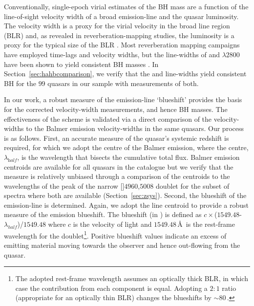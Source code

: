 Conventionally, single-epoch virial estimates of the BH mass are a function of the line-of-sight velocity width of a broad emission-line and the quasar luminosity. 
The velocity width is a proxy for the virial velocity in the broad line region (BLR) and, as revealed in reverberation-mapping studies, the luminosity is a proxy for the typical size of the BLR \citep[the $R-L$ relation; e.g.][]{kaspi00,kaspi07}. 
Most reverberation mapping campaigns have employed \hb time-lags and velocity widths, but the line-widths of \ha and $\lambda$$2800$ have been shown to yield consistent BH masses \citep[e.g.][]{mclure02,greene05b,onken08,shen08,wang09,rafiee11,mejia-restrepo16}. 
In Section~\ref{sec:hahbcomparison}, we verify that the \ha and \hb line-widths yield consistent BH for the $99$ quasars in our sample with measurements of both.     

In our work, a robust measure of the  emission-line `blueshift' provides the basis for the corrected  velocity-width measurements, and hence BH masses.
The effectiveness of the scheme is validated via a direct comparison of the  velocity-widths to the Balmer emission velocity-widths in the same quasars. 
Our process is as follows. 
First, an accurate measure of the quasar's systemic redshift is required, for which we adopt the centre of the Balmer emission, where the centre, $\lambda_{\mathrm half}$, is the wavelength that bisects the cumulative total flux. 
Balmer emission centroids are available for all quasars in the catalogue but we verify that the measure is relatively unbiased through a comparison of the centroids to the wavelengths of the peak of the narrow []\ll$4960$,$5008$ doublet for the subset of spectra where both are available (Section~\ref{sec:zsys}). 
Second, the blueshift of the  emission-line is determined. 
Again, we adopt the line centroid to provide a robust measure of the  emission blueshift.
The blueshift (in \kms) is defined as $c\times$($1549.48$-$\lambda_{half}$)/$1549.48$ where $c$ is the velocity of light and $1549.48$\,\AA\, is the rest-frame wavelength for the  doublet\footnote{The adopted  rest-frame wavelength assumes an optically thick BLR, in which case the contribution from each component is equal. Adopting a $2:1$ ratio (appropriate for an optically thin BLR) changes the blueshifts by $\sim80$\,\kms.}. 
Positive blueshift values indicate an excess of emitting material moving towards the observer and hence out-flowing from the quasar. 

